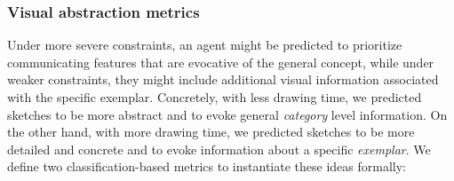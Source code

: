 \documentclass[10pt,letterpaper]{article}
\makeatletter
\newcommand{\hh}[1]{\textcolor{Blue}{@hh: #1}}
\makeatother
\begin{document}
\begin{table}[htp!]
\centering
\vspace{-0.5em}
\vspace{-0.5em}
\caption{Models evaluated and their network architecture backbone and training paradigm.}
\vspace{-1em}
\label{tab:models}
\end{table}
\subsubsection{Visual abstraction metrics} 

Under more severe constraints, an agent might be predicted to prioritize communicating features that are evocative of the general concept, while under weaker constraints, they might include additional visual information associated with the specific exemplar.
Concretely, with less drawing time, we predicted sketches to be more abstract and to evoke general \textit{category} level information.
On the other hand, with more drawing time, we predicted sketches to be more detailed and concrete and to evoke information about a specific \textit{exemplar}.
We define two classification-based metrics to instantiate these ideas formally:
\end{document}
